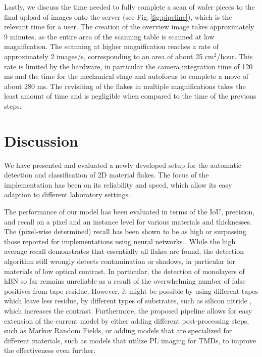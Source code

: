 \documentclass[reprint, prl, superscriptaddress, floatfix]{revtex4-2}
\newcommand{\fig}[1]{Fig.\,\ref{#1}}
\begin{document}
Lastly, we discuss the time needed to fully complete a scan of wafer pieces to the final upload of images onto the server (see \fig{fig:pipeline}), which is the relevant time for a user.
The creation of the overview image takes approximately 9 minutes, as the entire area of the scanning table is scanned at low magnification. 
The scanning at higher magnification reaches a rate of approximately 2 images/s, corresponding to an area of about 25 cm$^2$/hour. %
This rate is limited by the hardware, in particular the camera integration time of 120 ms and the time for the mechanical stage and autofocus to complete a move of about 280 ms.
The revisiting of the flakes in multiple magnifications takes the least amount of time and is negligible when compared to the time of the previous steps.


\section{Discussion}

We have presented and evaluated a newly developed setup for the automatic detection and classification of 2D material flakes.
The focus of the implementation has been on its reliability and speed, which allow its easy adaption to different laboratory settings.


The performance of our model has been evaluated in terms of the IoU, precision, and recall on a pixel and an instance level for various materials and thicknesses. 
The (pixel-wise determined) recall has been shown to be as high or surpassing those reported for implementations using neural networks \cite{Han2020Jul, Yang2022Aug, Siao2021}. 
While the high average recall demonstrates that essentially all flakes are found, the detection algorithm still wrongly detects contamination or shadows, in particular for materials of low optical contrast. 
In particular, the detection of monolayers of hBN so far remains unreliable as a result of the overwhelming number of false positives from tape residue.  
However, it might be possible by using different tapes which leave less residue, by different types of substrates, such as silicon nitride \cite{Hattori2022}, which increases the contrast.
Furthermore, the proposed pipeline allows for easy extension of the current model by either adding different post-processing steps, such as Markov Random Fields, or adding models that are specialized for different materials, such as models that utilize PL imaging for TMDs, to improve the effectiveness even further.
\end{document}
